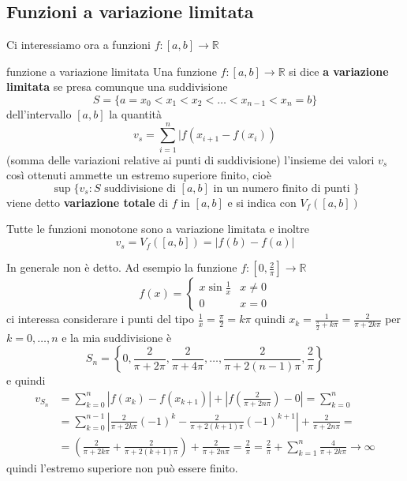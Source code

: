 \subsection{Funzioni a variazione limitata}
Ci interessiamo ora a funzioni \(f : [a, b] \to \mathbb{R}\) 
\begin{definition}{funzione a variazione limitata}
    Una funzione \(f: [a,b] \to \mathbb{R}\) si dice \textbf{a variazione
    limitata} se presa comunque una suddivisione
    \[
      S = \{a = x_{0} < x_{1} < x_{2} < \dots < x_{n-1} < x_{n} = b\} 
    \]
    dell'intervallo \([a,b]\) la quantità
    \[
      v_s = \sum_{i=1}^{n} |f{(x_{i+1} -f{(x_{i})})} 
    \]
    (somma delle variazioni relative ai punti di suddivisione)
    l'insieme dei valori \(v_s\) così ottenuti ammette un estremo superiore
    finito, cioè 
    \[
        \sup \{v_s : S \text{ suddivisione di \([a,b]\) in un numero finito di
        punti  }\} 
    \]
    viene detto \textbf{variazione totale} di \(f\) in \([a,b]\) e si indica con
    \(V_f{([a,b])}\)
\end{definition}
\begin{example}
    Tutte le funzioni monotone sono a variazione limitata e inoltre
    \[
        v_s = V_f{([a,b])} = |f{(b)} - f{(a)}|
    \]
\end{example}
\begin{example}
    In generale non è detto. Ad esempio la funzione \(f : [0, \frac{2}{\pi}] \to
    \mathbb{R}\) 
    \[
      f{(x)} = \begin{cases}
          x \sin \frac{1}{x} & x \neq 0 \\
          0 & x = 0
      \end{cases}
    \]
    ci interessa considerare i punti del tipo \(\frac{1}{x} = \frac{\pi}{2} = k
    \pi\) quindi \(x_k = \frac{1}{\frac{\pi}{2} + k \pi} = \frac{2}{\pi + 2k\pi}\) per \(k = 0, \dots,
    n\) e la mia suddivisione è
    \[
        S_{n} = \left\{0, \frac{2}{\pi + 2\pi}, \frac{2}{\pi + 4\pi}, \dots,
        \frac{2}{\pi + 2(n-1)\pi}, \frac{2}{\pi}\right\}
    \]
    e quindi
    \begin{align*}
        v_{S_{n}}  &= \sum_{k=0}^{n} |f{(x_k)} - f{(x_{k+1})}| + \left|f{\left(\frac{2}{\pi
        + 2n \pi}\right)} - 0\right| = \sum_{k=0}^{n} \\
                   &= \sum_{k=0}^{n-1} \left| \frac{2}{\pi + 2k\pi}{(-1)}^{k} -
                   \frac{2}{\pi + 2(k+1)\pi}{(-1)}^{k+1} \right| + \frac{2}{\pi
                   + 2n \pi} = \\
        &= {\left( \frac{2}{\pi + 2k\pi} + \frac{2}{\pi + 2{(k+1)}\pi} \right)}
        + \frac{2}{\pi + 2n \pi} = \frac{2}{\pi} = \frac{2}{\pi} +
        \sum_{k=1}^{n} \frac{4}{\pi + 2k\pi} \to \infty 
    \end{align*}
    quindi l'estremo superiore non può essere finito.

\end{example}
